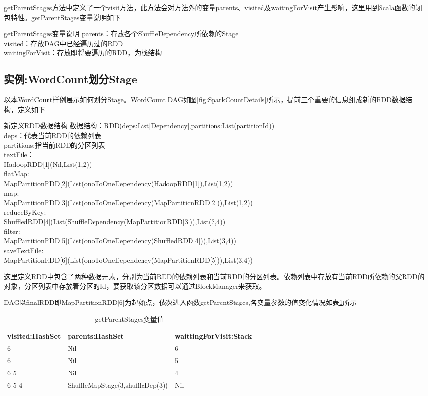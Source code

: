 getParentStages方法中定义了一个visit方法，此方法会对方法外的变量parents、visited及waitingForVisit产生影响，这里用到Scala函数的闭包特性。getParentStages变量说明如下
\begin{centertitlebox}{getParentStages变量说明}
	parents：存放各个ShuffleDependency所依赖的Stage\\
	visited：存放DAG中已经遍历过的RDD\\
	waitingForVisit：存放即将要遍历的RDD，为栈结构
\end{centertitlebox}
\subsection{实例:WordCount划分Stage}

以本WordCount样例展示如何划分Stage。WordCount DAG如图\ref{fig:SparkCountDetails}所示，提前三个重要的信息组成新的RDD数据结构，定义如下
\begin{centertitlebox}{新定义RDD数据结构}
	数据结构：RDD(deps:List[Dependency],partitions:List(partitionId))\\
	deps：代表当前RDD的依赖列表\\
	partitions:指当前RDD的分区列表\\
	textFile：\\  HadoopRDD[1](Nil,List(1,2))\\
	flatMap:\\  MapPartitionRDD[2](List(onoToOneDependency(HadoopRDD[1]),List(1,2))\\
	map:\\  MapPartitionRDD[3](List(onoToOneDependency(MapPartitionRDD[2])),List(1,2))\\
	reduceByKey:\\  ShuffledRDD[4](List(ShuffleDependency(MapPartitionRDD[3])),List(3,4))\\
	filter:\\  MapPartitionRDD[5](List(onoToOneDependency(ShuffledRDD[4])),List(3,4))\\
	saveTextFile:\\  MapPartitionRDD[6](List(onoToOneDependency(MapPartitionRDD[5])),List(3,4))
\end{centertitlebox}

这里定义RDD中包含了两种数据元素，分别为当前RDD的依赖列表和当前RDD的分区列表。依赖列表中存放有当前RDD所依赖的父RDD的对象，分区列表中存放着分区的Id，要获取该分区数据可以通过BlockManager来获取。

DAG以finalRDD即MapPartitionRDD[6]为起始点，依次进入函数getParentStages,各变量参数的值变化情况如表\ref{tab:getstage}所示
\begin{table}[H]
	\caption{getParentStages变量值}
	\label{tab:getstage}
	\begin{tabularx}{\linewidth}{lXX}
		\toprule[1.5pt]
		{\heiti visited:HashSet} & {\heiti parents:HashSet} &{\heiti waittingForVisit:Stack}\\
		\midrule[1pt]
		6& Nil &6 \\
		6& Nil &5 \\
		6 5& Nil &4 \\
		6 5 4& ShuffleMapStage(3,shuffleDep(3)) &Nil \\
		\bottomrule[1.5pt]
	\end{tabularx}
\end{table}


